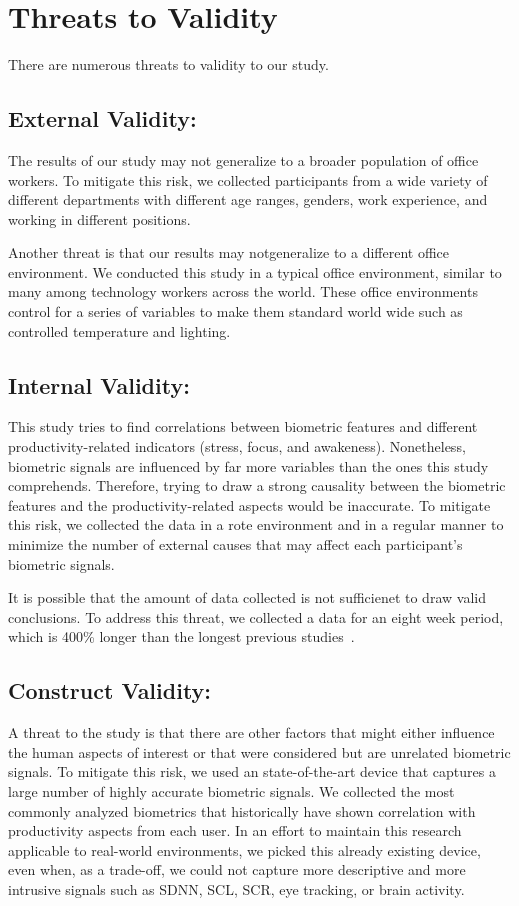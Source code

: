 \section{Threats to Validity}
There are numerous threats to validity to our study.

\subsection{External Validity:}
The results of our study may 
 not generalize to a broader population of office workers.
To mitigate this risk, we collected participants
from a wide variety of different departments
with different age ranges, genders, work experience, and 
working in different positions.

Another threat is that our results may notgeneralize
to a different office environment. We  conducted
this study in a typical office environment,  similar to many
among technology workers across the world.
These office environments control for a series of
variables to make them standard world wide such
as controlled temperature and lighting.

\subsection{Internal Validity:}
This study tries to find correlations between
biometric features and different productivity-related indicators (stress, focus, and awakeness).
Nonetheless, biometric signals are influenced by far more
variables than the ones this study comprehends.
Therefore, trying to draw a strong causality between the biometric
features and the productivity-related aspects would be inaccurate.
To mitigate this risk,  we collected the data
in a rote environment and in a regular manner 
to minimize the number of 
external causes that may affect each participant's
biometric signals.

It is possible that the amount of data collected
is not sufficienet
to draw valid conclusions. To address this threat, 
we collected a data for an eight week period, which is
400\% longer than the longest previous studies~\cite{zuger18,Muller16}.


\subsection{Construct Validity:}
A threat to the study is that
there are other factors that might either influence the
human aspects of interest or that were considered but
are unrelated biometric signals.
To mitigate this risk, we used an state-of-the-art
device that captures a large number of highly accurate biometric
signals. We collected the most commonly analyzed
biometrics that historically have shown correlation with 
productivity aspects from each user.
In an effort to maintain this research applicable to real-world environments, we picked this already existing device, even when, as a trade-off, we could not capture more descriptive and more intrusive signals such as SDNN, SCL, SCR, eye tracking, or brain activity.

